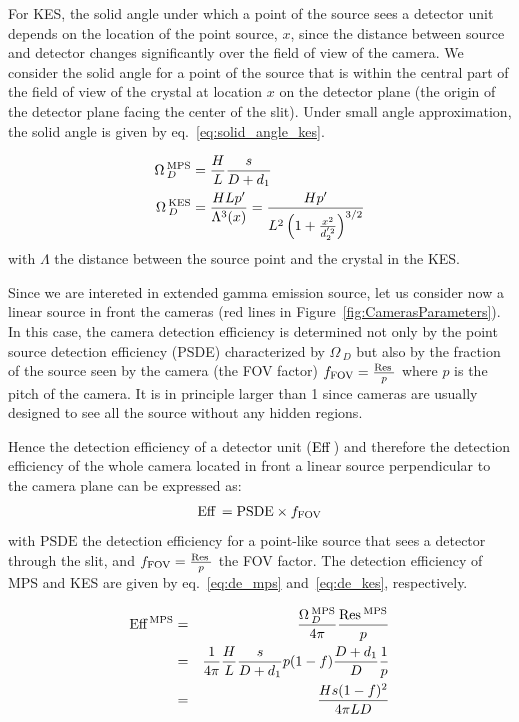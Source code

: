 \documentclass[a4paper,english]{article}
\begin{document}
For KES, the solid angle under which a point of the source sees a detector unit depends on the location of the point source, $x$, since the distance between source and detector changes significantly over the field of view of the camera. We
consider the solid angle for a point of the source that is within the central
part of the field of view of the crystal at location $x$ on the detector plane
(the origin of the detector plane facing the center of the slit). Under small
angle approximation, the solid angle is given by eq.~\ref{eq:solid_angle_kes}.

\begin{align}  
  \Omega\,_D^{\textrm{MPS}} & = \frac{H}{L} \frac{s}{D+d_1} \label{eq:solid_angle_mps} \\
	\Omega\,_D^{\textrm{KES}} & = \frac{H L p'}{\Lambda^3(x)} =  \frac{H p'}{L^2 \left( 1+\frac{x^2}{d_2^{'2}} \right)^{3/2}} \label{eq:solid_angle_kes} 
\end{align}
with $\Lambda$ the distance between the source point and the crystal in the KES.


Since we are intereted in extended gamma emission source, let us consider now a linear source in front the cameras (red lines in Figure~\ref{fig:CamerasParameters}). In this case, the camera detection efficiency is determined not only by the point source detection efficiency (PSDE) characterized by $\Omega\,_D$ but also by the fraction of the source seen by the camera (the FOV factor) $f_{\textrm{FOV}} = \frac{\textrm{Res}\,_{}}{p}$ where $p$ is the pitch of the camera. It is in principle larger than 1 since cameras are usually designed to see all the source without any hidden regions.

Hence the detection efficiency of a detector unit ($\textrm{Eff}\,_{}$) and therefore the detection efficiency of the whole camera located in front a linear source perpendicular to  the camera plane can be expressed as:
\begin{align} 
	\textrm{Eff}\,_{} = \textrm{PSDE} \times f_{\textrm{FOV}}
\end{align}
with $\textrm{PSDE}$ the detection efficiency for a point-like source that sees a detector through the slit, and $f_{\textrm{FOV}} = \frac{\textrm{Res}\,_{}}{p}$ the FOV factor. The detection efficiency of MPS and KES are given by eq.~\ref{eq:de_mps} and~\ref{eq:de_kes}, respectively.

\begin{eqnarray}
  \label{eq:de_mps}
  \textrm{Eff}\,_{}^{\textrm{MPS}} & = & \frac{\Omega\,_D^{\textrm{MPS}}}{4\pi} \frac{\textrm{Res}\,_{}^{\textrm{MPS}}}{p} \nonumber\\
                & = & \frac{1}{4\pi} \frac{H}{L} \frac{s}{D+d_1} p(1-f)
                      \frac{D+d_1}{D} \frac{1}{p} \nonumber\\
                & = & \frac{Hs(1-f)^2}{4 \pi L D}
\end{eqnarray}
\end{document}
